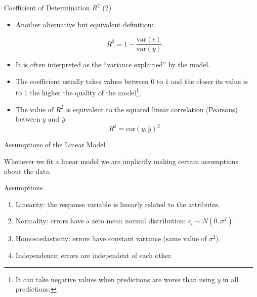\documentclass[handout]{beamer}
\begin{document}
\begin{frame}{Coefficient of Determination $R^2$ (2)}
\scriptsize{
\begin{itemize}
 
 \item Another alternative but equivalent definition:
 
   \begin{equation}
  R^2= 1-\frac{\text{var}(\epsilon)}{\text{var}(y)} 
 \end{equation}

 \item It is often interpreted as the ``variance explained'' by the model.
 
 \item The coefficient usually takes values between $0$ to $1$ and the closer its value is to 1 the higher the quality of the model\footnote{It can take negative values when predictions are worse than using $\overline{y}$ in all predictions.}.
 
 \item The value of $R^2$ is equivalent to the squared linear correlation (Pearsons) between $y$ and $\hat{y}$.
\begin{displaymath}
 R^2=\text{cor}(y,\hat{y})^2
\end{displaymath}
  
\end{itemize}


}
\end{frame}



\begin{frame}{Assumptions of the Linear Model}
\scriptsize{





Whenever we fit a linear model we are implicitly making certain assumptions about the data.  


\begin{block}{Assumptions}
\begin{enumerate}
\item Linearity: the response variable is linearly related to the attributes. 
\item  Normality: errors have a zero mean normal distribution: $\epsilon_{i} \sim N(0,\sigma^2)$.
\item Homoscedasticity: errors have constant variance (same value of $\sigma^2$).
\item Independence: errors are independent of each other.
 
\end{enumerate}
 
\end{block}

} 
\end{frame}
\end{document}
